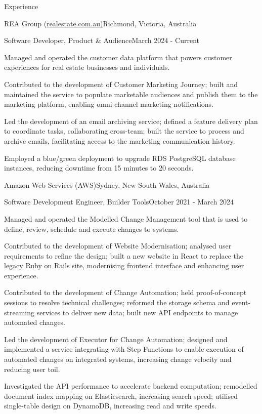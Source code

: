 \documentclass{cv}
\begin{document}
\begin{cvsection}{Experience}

\begin{cvheading}{REA Group (\href{https://realestate.com.au/}{realestate.com.au)}}{Richmond, Victoria, Australia}
\begin{cvsubheading}{Software Developer, Product \& Audience}{March 2024 - Current}
\item Managed and operated the customer data platform that powers customer experiences for real estate businesses and individuals.
\item Contributed to the development of Customer Marketing Journey; built and maintained the service to populate marketable audiences and publish them to the marketing platform, enabling omni-channel marketing notifications.
\item Led the development of an email archiving service; defined a feature delivery plan to coordinate tasks, collaborating cross-team; built the service to process and archive emails, facilitating access to the marketing communication history.
\item Employed a blue/green deployment to upgrade RDS PostgreSQL database instances, reducing downtime from 15 minutes to 20 seconds.
\end{cvsubheading}
\end{cvheading}

\begin{cvheading}{Amazon Web Services (AWS)}{Sydney, New South Wales, Australia}
\begin{cvsubheading}{Software Development Engineer, Builder Tools}{October 2021 - March 2024}
\item Managed and operated the Modelled Change Management tool that is used to define, review, schedule and execute changes to systems.
\item Contributed to the development of Website Modernisation; analysed user requirements to refine the design; built a new website in React to replace the legacy Ruby on Rails site, modernising frontend interface and enhancing user experience.
\item Contributed to the development of Change Automation; held proof-of-concept sessions to resolve technical challenges; reformed the storage schema and event-streaming services to deliver new data; built new API endpoints to manage automated changes.
\item Led the development of Executor for Change Automation; designed and implemented a service integrating with Step Functions to enable execution of automated changes on integrated systems, increasing change velocity and reducing user toil.
\item Investigated the API performance to accelerate backend computation; remodelled document index mapping on Elasticsearch, increasing search speed; utilised single-table design on DynamoDB, increasing read and write speeds.
\end{cvsubheading}
\end{cvheading}


\end{cvsection}
\end{document}
